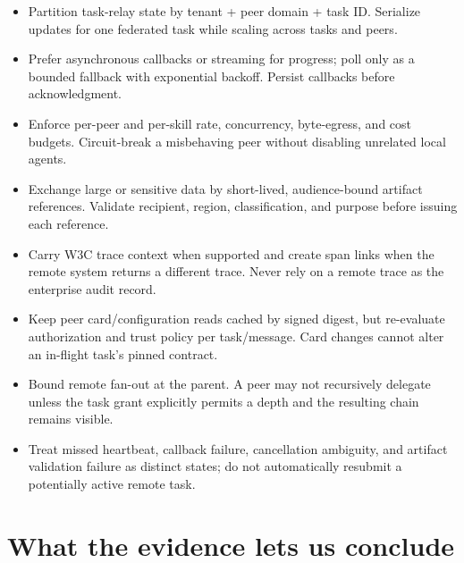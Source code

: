 \begin{itemize}

\item Partition task-relay state by tenant + peer domain + task ID. Serialize updates for one federated task while scaling across tasks and peers.

\item Prefer asynchronous callbacks or streaming for progress; poll only as a bounded fallback with exponential backoff. Persist callbacks before acknowledgment.

\item Enforce per-peer and per-skill rate, concurrency, byte-egress, and cost budgets. Circuit-break a misbehaving peer without disabling unrelated local agents.

\item Exchange large or sensitive data by short-lived, audience-bound artifact references. Validate recipient, region, classification, and purpose before issuing each reference.

\item Carry W3C trace context when supported and create span links when the remote system returns a different trace. Never rely on a remote trace as the enterprise audit record.

\item Keep peer card/configuration reads cached by signed digest, but re-evaluate authorization and trust policy per task/message. Card changes cannot alter an in-flight task’s pinned contract.

\item Bound remote fan-out at the parent. A peer may not recursively delegate unless the task grant explicitly permits a depth and the resulting chain remains visible.

\item Treat missed heartbeat, callback failure, cancellation ambiguity, and artifact validation failure as distinct states; do not automatically resubmit a potentially active remote task.

\end{itemize}

\section{What the evidence lets us conclude}

